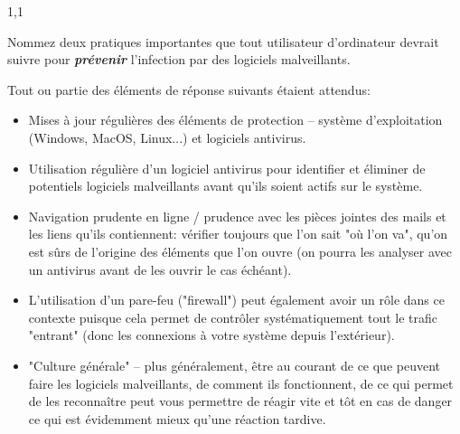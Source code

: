 \documentclass[11pt,a4paper]{exam}
\begin{document}
\begin{spacing}{1,1}
\begin{questions}
        	\question[2] Nommez deux pratiques importantes que tout utilisateur d'ordinateur devrait suivre pour \textbf{\textit{prévenir}} l'infection par des logiciels malveillants.
        	\begin{solution}
        		Tout ou partie des éléments de réponse suivants étaient attendus:
        		\begin{itemize}
        			\item Mises à jour régulières des éléments de protection -- système d'exploitation (Windows, MacOS, Linux...) et logiciels antivirus.
        			\item Utilisation régulière d'un logiciel antivirus pour identifier et éliminer de potentiels logiciels malveillants avant qu'ils soient actifs sur le système.
        			\item Navigation prudente en ligne / prudence avec les pièces jointes des mails et les liens qu'ils contiennent: vérifier toujours que l'on sait "où l'on va", qu'on est sûrs de l'origine des éléments que l'on ouvre (on pourra les analyser avec un antivirus avant de les ouvrir le cas échéant).
        			\item L'utilisation d'un pare-feu ("firewall") peut également avoir un rôle dans ce contexte puisque cela permet de contrôler systématiquement tout le trafic "entrant" (donc les connexions à votre système depuis l'extérieur).
        			\item "Culture générale" -- plus généralement, être au courant de ce que peuvent faire les logiciels malveillants, de comment ils fonctionnent, de ce qui permet de les reconnaître peut vous permettre de réagir vite et tôt en cas de danger ce qui est évidemment mieux qu'une réaction tardive.
        		\end{itemize}
        	\end{solution}
        		

\end{questions}
\end{spacing}
\end{document}
